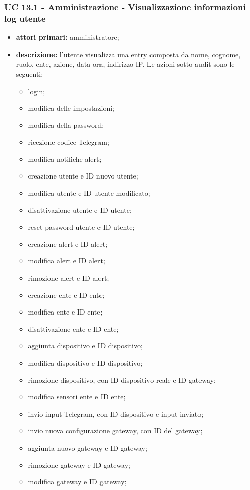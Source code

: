 		\subsubsection{UC 13.1 - Amministrazione - Visualizzazione informazioni log utente}
		\begin{itemize}
			\item \textbf{attori primari:} amministratore;
			\item \textbf{descrizione:} l'utente visualizza una entry composta da nome, cognome, ruolo, ente, azione, data-ora, indirizzo IP. Le azioni sotto audit sono le seguenti:

			\begin{itemize}
				\item login;
				\item modifica delle impostazioni;
				\item modifica della password;
				\item ricezione codice Telegram;
				\item modifica notifiche alert;
				\item creazione utente e ID nuovo utente;
				\item modifica utente e ID utente modificato;
				\item disattivazione utente e ID utente;
				\item reset password utente e ID utente;
				\item creazione alert e ID alert;
				\item modifica alert e ID alert;
				\item rimozione alert e ID alert;
				\item creazione ente e ID ente;
				\item modifica ente e ID ente;
				\item disattivazione ente e ID ente;
				\item aggiunta dispositivo e ID dispositivo;
				\item modifica dispositivo e ID dispositivo;
				\item rimozione dispositivo, con ID dispositivo reale e ID gateway;
				\item modifica sensori ente e ID ente;
				\item invio input Telegram, con ID dispositivo e input inviato;
				\item invio nuova configurazione gateway, con ID del gateway;
				\item aggiunta nuovo gateway e ID gateway;
				\item rimozione gateway e ID gateway;
				\item modifica gateway e ID gateway;
			\end{itemize}


\end{itemize}

